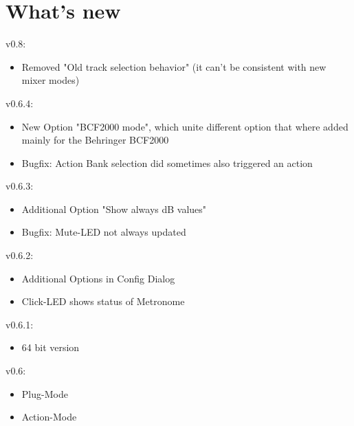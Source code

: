 \section{What's new}

v0.8:
\begin{itemize}
\item Removed "Old track selection behavior" (it can't be consistent with new mixer modes)
\end{itemize}

\noindent
v0.6.4:
\begin{itemize}
\item New Option "BCF2000 mode", which unite different option that where added
mainly for the Behringer BCF2000 
\end{itemize}

\begin{itemize}
\item Bugfix: Action Bank selection did sometimes also triggered an action
\end{itemize}

\noindent
v0.6.3:
\begin{itemize}
\item Additional Option "Show always dB values" 
\item Bugfix: Mute-LED not always updated
\end{itemize}

\noindent
v0.6.2:
\begin{itemize}
\item Additional Options in Config Dialog 
\item Click-LED shows status of Metronome
\end{itemize}

\noindent
v0.6.1:
\begin{itemize}
\item 64 bit version
\end{itemize}

\noindent
v0.6:
\begin{itemize}
\item Plug-Mode 
\item Action-Mode 
\end{itemize}

